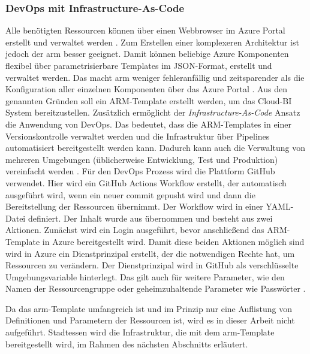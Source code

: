 \subsubsection{DevOps mit Infrastructure-As-Code} \label{subsec:infra:konfig:policy}
Alle benötigten Ressourcen können über einen Webbrowser im Azure Portal erstellt und verwaltet werden \cite{chilberto_building_2020}. Zum Erstellen einer komplexeren Architektur ist jedoch der \ac{arm} besser geeignet. Damit können beliebige Azure Komponenten flexibel über parametrisierbare Templates im JSON-Format, erstellt und verwaltet werden. Das macht \ac{arm} weniger fehleranfällig und zeitsparender als die Konfiguration aller einzelnen Komponenten über das Azure Portal \cite{monadjemi_azure-administration_2017}. Aus den genannten Gründen soll ein ARM-Template erstellt werden, um das Cloud-BI System bereitzustellen. Zusätzlich ermöglicht der \textit{Infrastructure-As-Code} Ansatz die Anwendung von DevOps. Das bedeutet, dass die ARM-Templates in einer Versionskontrolle verwaltet werden und die Infrastruktur über Pipelines automatisiert bereitgestellt werden kann. Dadurch kann auch die Verwaltung von mehreren Umgebungen (üblicherweise Entwicklung, Test und Produktion) vereinfacht werden \cite{riscutia_data_2021}. Für den DevOps Prozess wird die Plattform GitHub verwendet. Hier wird ein GitHub Actions Workflow erstellt, der automatisch ausgeführt wird, wenn ein neuer commit gepusht wird und dann die Bereitstellung der Ressourcen übernimmt. Der Workflow wird in einer YAML-Datei definiert. Der Inhalt wurde aus  übernommen und besteht aus zwei Aktionen. Zunächst wird ein Login ausgeführt, bevor anschließend das ARM-Template in Azure bereitgestellt wird. Damit diese beiden Aktionen möglich sind wird in Azure ein Dienstprinzipal erstellt, der die notwendigen Rechte hat, um Ressourcen zu verändern. Der Dienstprinzipal wird in GitHub als verschlüsselte Umgebungsvariable hinterlegt. Das gilt auch für weitere Parameter, wie den Namen der Ressourcengruppe oder geheimzuhaltende Parameter wie Passwörter \cite[vgl.][]{rendon_deploy_2022}.

Da das \ac{arm}-Template umfangreich ist und im Prinzip nur eine Auflistung von Definitionen und Parametern der Ressourcen ist, wird es in dieser Arbeit nicht aufgeführt. Stadtessen wird die Infrastruktur, die mit dem \ac{arm}-Template bereitgestellt wird, im Rahmen des nächsten Abschnitts erläutert.